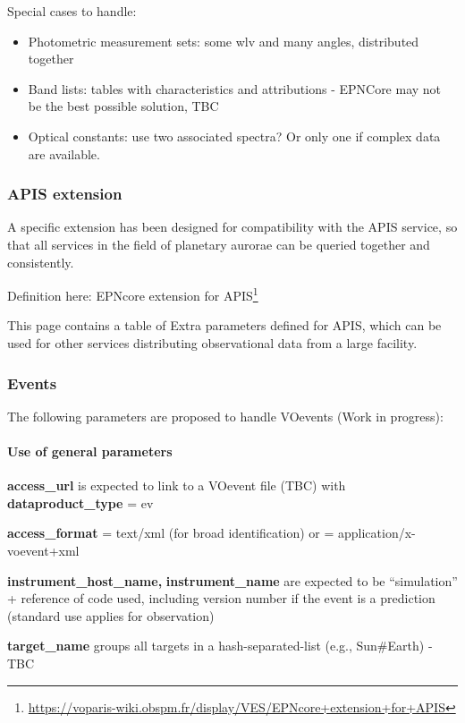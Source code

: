\documentclass[11pt,a4paper]{ivoa}
\begin{document}
Special cases to handle:

\begin{itemize}
\item Photometric measurement sets: some wlv and many angles, distributed together
\item Band lists: tables with characteristics and attributions - EPNCore may not be the best possible solution, TBC
\item Optical constants: use two associated spectra? Or only one if complex data are available.
\end{itemize}

\subsubsection{APIS extension}

A specific extension has been designed for compatibility with the APIS service, so that all services in the field of planetary aurorae can be queried together and consistently.

Definition here: EPNcore extension for APIS\footnote{\url{https://voparis-wiki.obspm.fr/display/VES/EPNcore+extension+for+APIS}}

This page contains a table of Extra parameters defined for APIS, which can be used for other services distributing observational data from a large facility.

\subsubsection{Events}

The following parameters are proposed to handle VOevents (Work in progress):

\paragraph{Use of general parameters\textbf{ }}


\textbf{access\_url} is expected to link to a VOevent file (TBC) with \textbf{dataproduct\_type} = ev 

\textbf{access\_format} = text/xml (for broad identification) or = application/x-voevent+xml 

\textbf{instrument\_host\_name,} \textbf{instrument\_name} are expected to be ``simulation'' + reference of code used, including version number if the event is a prediction (standard use applies for observation)

\textbf{target\_name} groups all targets in a hash-separated-list (e.g., Sun\#Earth) - TBC
\end{document}
